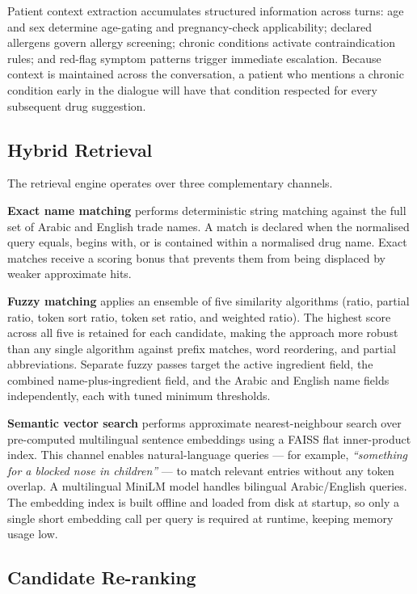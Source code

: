\documentclass[12pt,a4paper]{article}
\begin{document}
Patient context extraction accumulates structured information across turns:
age and sex determine age-gating and pregnancy-check applicability; declared
allergens govern allergy screening; chronic conditions activate
contraindication rules; and red-flag symptom patterns trigger immediate
escalation. Because context is maintained across the conversation, a patient
who mentions a chronic condition early in the dialogue will have that condition
respected for every subsequent drug suggestion.

\subsection{Hybrid Retrieval}

The retrieval engine operates over three complementary channels.

\textbf{Exact name matching} performs deterministic string matching against
the full set of Arabic and English trade names. A match is declared when the
normalised query equals, begins with, or is contained within a normalised drug
name. Exact matches receive a scoring bonus that prevents them from being
displaced by weaker approximate hits.

\textbf{Fuzzy matching} applies an ensemble of five similarity algorithms
(ratio, partial ratio, token sort ratio, token set ratio, and weighted ratio).
The highest score across all five is retained for each candidate, making the
approach more robust than any single algorithm against prefix matches, word
reordering, and partial abbreviations. Separate fuzzy passes target the active
ingredient field, the combined name-plus-ingredient field, and the Arabic and
English name fields independently, each with tuned minimum thresholds.

\textbf{Semantic vector search} performs approximate nearest-neighbour search
over pre-computed multilingual sentence embeddings using a FAISS flat
inner-product index. This channel enables natural-language queries ---
for example, \textit{``something for a blocked nose in children''} --- to
match relevant entries without any token overlap. A multilingual MiniLM
model handles bilingual Arabic/English queries. The embedding index is
built offline and loaded from disk at startup, so only a single short
embedding call per query is required at runtime, keeping memory usage low.

\subsection{Candidate Re-ranking}
\end{document}
